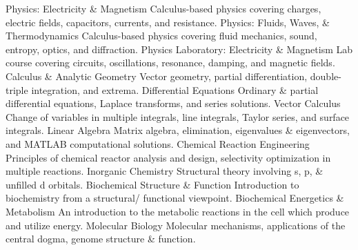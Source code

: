 \begin{cvskills}
\cvskill
    {Physics: Electricity \& Magnetism} %
    {Calculus-based physics covering charges, electric fields, capacitors, currents, and resistance.} %
\cvskill
    {Physics: Fluids, Waves, \& Thermodynamics} %
    {Calculus-based physics covering fluid mechanics, sound, entropy, optics, and diffraction.} %
\cvskill
    {Physics Laboratory: Electricity \& Magnetism} %
    {Lab course covering circuits, oscillations, resonance, damping, and magnetic fields.} %
\cvskill
    {Calculus \& Analytic Geometry} %
    {Vector geometry, partial differentiation, double-triple integration, and extrema.} %
\cvskill
    {Differential Equations} %
    {Ordinary \& partial differential equations, Laplace transforms, and series solutions.} %
\cvskill
    {Vector Calculus} %
    {Change of variables in multiple integrals, line integrals, Taylor series, and surface integrals.} %
\cvskill
    {Linear Algebra} %
    {Matrix algebra, elimination, eigenvalues \& eigenvectors, and MATLAB computational solutions.} %
\cvskill
    {Chemical Reaction Engineering} %
    {Principles of chemical reactor analysis and design, selectivity optimization in multiple reactions.} %
\cvskill
    {Inorganic Chemistry} %
    {Structural theory involving s, p, \& unfilled d orbitals. } %
\cvskill
    {Biochemical Structure \& Function} %
    {Introduction to biochemistry from a structural/ functional viewpoint.} %
\cvskill
    {Biochemical Energetics \& Metabolism} %
    {An introduction to the metabolic reactions in the cell which produce and utilize energy.} %
\cvskill
    {Molecular Biology} %
    {Molecular mechanisms, applications of the central dogma, genome structure \& function.} %

\end{cvskills}
